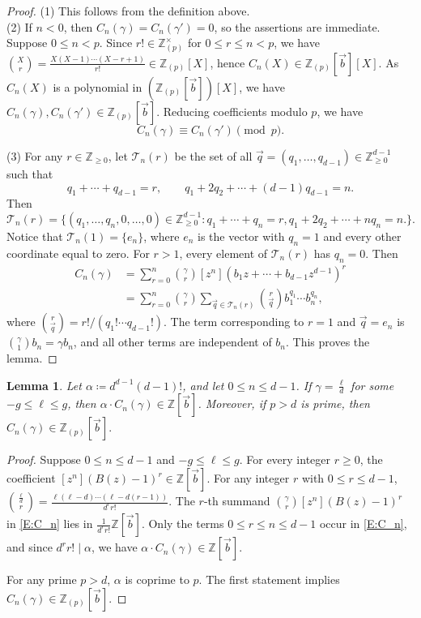 \documentclass{amsart}
\theoremstyle{plain}
\newtheorem{lemma}[theorem]{Lemma}
\theoremstyle{remark}
\newcommand{\cT}{\mathcal{T}}
\newcommand{\1}{\mathbf{1}}
\newcommand{\Z}{\mathbb{Z}}
\newcommand{\vb}{{\vec{b}}}
\newcommand{\vq}{{\vec{q}}}
\begin{document}
\begin{proof}
(1) This follows from the definition above.\\
(2)
If $n<0$, then
$C_n(\gamma)=C_n(\gamma')=0$, so
the assertions are immediate.
Suppose $0\le n<p$.
Since $r!\in\Z_{(p)}^\times$ for $0\le r\le n<p$, we have
$\binom{X}{r}
=
\frac{X (X-1)\cdots (X-r+1)}{r!}\in\Z_{(p)}[X]$,
hence $C_n(X)\in\Z_{(p)}[\vb][X]$.
As $C_n(X)$ is a polynomial in
$(\Z_{(p)}[\vb])[X]$, we have
$C_n(\gamma), C_n(\gamma')\in\Z_{(p)}[\vb]$.
Reducing coefficients modulo $p$, we have
\[
C_n(\gamma)\equiv C_n(\gamma')\pmod p.
\]

(3)
For any $r\in\Z_{\ge0}$,
let $\cT_n(r)$ be the set of all
$\vq=(q_1,\ldots,q_{d-1})\in\Z_{\ge 0}^{d-1}$ such that
\[
q_1+\cdots+q_{d-1}=r, \qquad q_1+2q_2+\cdots+(d-1)q_{d-1}=n.
\]
Then
\[
\cT_n(r)=\{(q_1,\ldots,q_n,0,\ldots,0)\in\Z_{\ge 0}^{d-1}:
q_1+\cdots+q_n=r, q_1+2q_2+\cdots+nq_n=n.
\}.
\]
Notice that $\cT_n(1)=\{e_n\}$, where $e_n$ is the vector
with $q_n=1$ and every other coordinate equal to zero.
For $r>1$, every element of $\cT_n(r)$ has $q_n=0$.
Then
\begin{align*}
C_n(\gamma)
&=\sum_{r=0}^n\binom{\gamma}{r} [z^n](b_1z+\cdots+b_{d-1}z^{d-1})^r\\
&=\sum_{r=0}^n \binom{\gamma}{r}\sum_{\vq\in \cT_n(r)}
\binom{r}{\vq}b_1^{q_1}\cdots b_n^{q_n},
\end{align*}
where $\binom{r}{\vq}=r!/(q_1!\cdots q_{d-1}!)$. The term
corresponding to $r=1$ and $\vq=e_n$ is
$\binom{\gamma}{1}b_n=\gamma b_n$, and all other terms are independent
of $b_n$.
This proves the lemma.
\end{proof}

\begin{lemma}\label{L:Z_p}
Let $\alpha\coloneqq d^{d-1}(d-1)!$, and let $0\le n\le d-1$.
If $\gamma=\frac{\ell}{d}$ for some $-g\le \ell\le g$,
then $\alpha\cdot C_n(\gamma)\in \Z[\vb]$.
Moreover, if $p>d$ is prime, then $
C_n(\gamma)\in\Z_{(p)}[\vb].
$
\end{lemma}

\begin{proof}
Suppose $0\le n\le d-1$ and $-g\le \ell\le g$.
For every integer $r\ge 0$, the coefficient
$[z^n](B(z)-1)^r\in\Z[\vb]$.
For any integer $r$ with $0\le r \le d-1$,
$\binom{\frac{\ell}{d}}{r}=\frac{\ell(\ell-d)\cdots (\ell-d(r-1))}{d^r r!}$.
The $r$-th summand $\binom{\gamma}{r}[z^n](B(z)-1)^r$ in \eqref{E:C_n}
lies in $\frac{1}{d^r r!}\Z[\vb]$.
Only the terms $0\le r\le n\le d-1$ occur in \eqref{E:C_n}, and since
$d^r r!\mid\alpha$,
we have $\alpha\cdot C_n(\gamma)\in\Z[\vb]$.

For any prime $p>d$, $\alpha$ is coprime to $p$.
The first statement implies $C_n(\gamma)\in\Z_{(p)}[\vb]$.
\end{proof}
\end{document}
